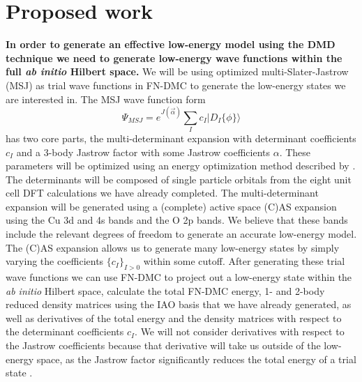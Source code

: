 \documentclass{article}
\begin{document}
\section{Proposed work}
\textbf{In order to generate an effective low-energy model using the DMD technique we need to generate low-energy wave functions within the full \textit{ab initio} Hilbert space.} 
We will be using optimized multi-Slater-Jastrow (MSJ) as trial wave functions in FN-DMC to generate the low-energy states we are interested in. 
The MSJ wave function form 
\begin{equation}
\Psi_{MSJ} = e^{J(\vec{\alpha})} \sum_I c_I |D_I{\{\phi\}}\rangle 
\end{equation}
has two core parts, the multi-determinant expansion with determinant coefficients $c_I$ and a 3-body Jastrow factor with some Jastrow coefficients $\alpha$. 
These parameters will be optimized using an energy optimization method described by \cite{Toulouse2007}. 
The determinants will be composed of single particle orbitals from the eight unit cell DFT calculations we have already completed.	
The multi-determinant expansion will be generated using a (complete) active space (C)AS expansion using the Cu 3d and 4s bands and the O 2p bands. 
We believe that these bands include the relevant degrees of freedom to generate an accurate low-energy model. 
The (C)AS expansion allows us to generate many low-energy states by simply varying the coefficients $\{c_I\}_{I>0}$ within some cutoff. 
After generating these trial wave functions we can use FN-DMC to project out a low-energy state within the \textit{ab initio} Hilbert space, calculate the total FN-DMC energy, 1- and 2-body reduced density matrices using the IAO basis that we have already generated, as well as derivatives of the total energy and the density matrices with respect to the determinant coefficients $c_I$. 
We will not consider derivatives with respect to the Jastrow coefficients because that derivative will take us outside of the low-energy space, as the Jastrow factor significantly reduces the total energy of a trial state \cite{PhysRevLett.75.3870}.
\end{document}
